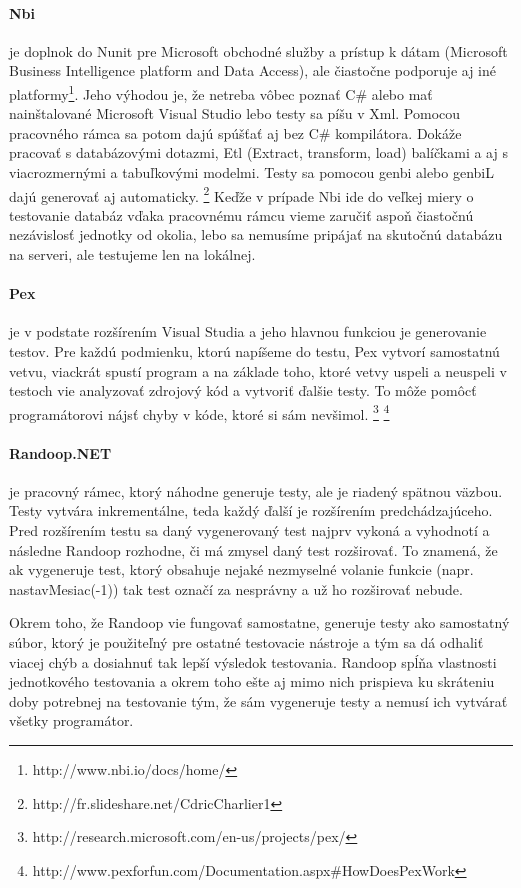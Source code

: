 \documentclass[11pt,twoside,slovak,a4paper]{article}
\begin{document}
		\paragraph{Nbi} je doplnok do Nunit pre Microsoft obchodné služby a prístup k dátam (Microsoft Business Intelligence platform and Data Access), ale čiastočne podporuje aj iné platformy\footnote{http://www.nbi.io/docs/home/}. Jeho výhodou je, že netreba vôbec poznať C\# alebo mať nainštalované Microsoft Visual Studio lebo testy sa píšu v Xml. Pomocou pracovného rámca sa potom dajú spúšťať aj bez C\# kompilátora. Dokáže pracovať s databázovými dotazmi, Etl (Extract, transform, load) balíčkami a aj s viacrozmernými a tabuľkovými modelmi.
		Testy sa pomocou genbi alebo genbiL dajú generovať aj automaticky. \footnote{http://fr.slideshare.net/CdricCharlier1}
		Keďže v prípade Nbi ide do veľkej miery o testovanie databáz vďaka pracovnému rámcu vieme zaručiť aspoň čiastočnú nezávislosť jednotky od okolia, lebo sa nemusíme pripájať na skutočnú databázu na serveri, ale testujeme len na lokálnej.
		
		
		\paragraph{Pex} je v podstate rozšírením Visual Studia a jeho hlavnou funkciou je generovanie testov. Pre každú podmienku, ktorú napíšeme do testu, Pex vytvorí samostatnú vetvu, viackrát spustí program a na základe toho, ktoré vetvy uspeli a neuspeli v testoch vie analyzovať zdrojový kód a vytvoriť ďalšie testy. To môže pomôcť programátorovi nájsť chyby v kóde, ktoré si sám nevšimol. \footnote{http://research.microsoft.com/en-us/projects/pex/}
		\footnote{http://www.pexforfun.com/Documentation.aspx\#HowDoesPexWork}
		
		\paragraph{Randoop.NET} je pracovný rámec, ktorý náhodne generuje testy, ale je riadený spätnou väzbou. Testy vytvára inkrementálne, teda každý ďalší je rozšírením predchádzajúceho. Pred rozšírením testu sa daný vygenerovaný test najprv vykoná a vyhodnotí a následne Randoop rozhodne, či má zmysel daný test rozširovať. To znamená, že ak vygeneruje test, ktorý obsahuje nejaké nezmyselné volanie funkcie (napr. nastavMesiac(-1)) tak test označí za nesprávny a už ho rozširovať nebude.
		
		Okrem toho, že Randoop vie fungovať samostatne, generuje testy ako samostatný súbor, ktorý je použiteľný pre ostatné testovacie nástroje a tým sa dá odhaliť viacej chýb a dosiahnuť tak lepší výsledok testovania\cite{Pacheco2007}.
		Randoop spĺňa vlastnosti jednotkového testovania a okrem toho ešte aj mimo nich prispieva ku skráteniu doby potrebnej na testovanie tým, že sám vygeneruje testy a nemusí ich vytvárať všetky programátor.
		
\end{document}
